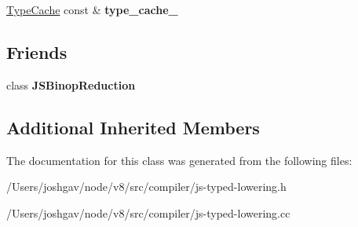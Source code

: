 \begin{DoxyCompactItemize}
\item 
\hyperlink{classv8_1_1internal_1_1_type_cache}{Type\+Cache} const \& {\bfseries type\+\_\+cache\+\_\+}\hypertarget{classv8_1_1internal_1_1compiler_1_1_j_s_typed_lowering_a0669c926b10f2fa7e399a78f1a3c9294}{}\label{classv8_1_1internal_1_1compiler_1_1_j_s_typed_lowering_a0669c926b10f2fa7e399a78f1a3c9294}

\end{DoxyCompactItemize}
\subsection*{Friends}
\begin{DoxyCompactItemize}
\item 
class {\bfseries J\+S\+Binop\+Reduction}\hypertarget{classv8_1_1internal_1_1compiler_1_1_j_s_typed_lowering_a7aad168635be7ec79eefeb524967418d}{}\label{classv8_1_1internal_1_1compiler_1_1_j_s_typed_lowering_a7aad168635be7ec79eefeb524967418d}

\end{DoxyCompactItemize}
\subsection*{Additional Inherited Members}


The documentation for this class was generated from the following files\+:\begin{DoxyCompactItemize}
\item 
/\+Users/joshgav/node/v8/src/compiler/js-\/typed-\/lowering.\+h\item 
/\+Users/joshgav/node/v8/src/compiler/js-\/typed-\/lowering.\+cc\end{DoxyCompactItemize}
